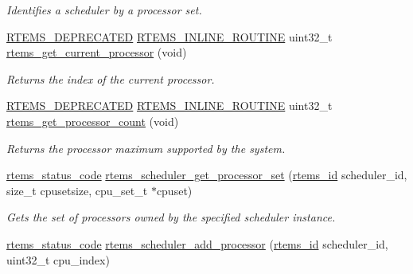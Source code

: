 \begin{DoxyCompactItemize}
\begin{DoxyCompactList}\small\item\em Identifies a scheduler by a processor set. \end{DoxyCompactList}\item 
\mbox{\hyperlink{group__RTEMSScoreBaseDefs_gab651a076d4d51d50221e7ef7ac99d4e7}{R\+T\+E\+M\+S\+\_\+\+D\+E\+P\+R\+E\+C\+A\+T\+ED}} \mbox{\hyperlink{group__RTEMSScoreBaseDefs_gac216239df231d5dbd15e3520b0b9313f}{R\+T\+E\+M\+S\+\_\+\+I\+N\+L\+I\+N\+E\+\_\+\+R\+O\+U\+T\+I\+NE}} uint32\+\_\+t \mbox{\hyperlink{group__ClassicTasks_ga2017f8bfa8565df99034f362638cb89c}{rtems\+\_\+get\+\_\+current\+\_\+processor}} (void)
\begin{DoxyCompactList}\small\item\em Returns the index of the current processor. \end{DoxyCompactList}\item 
\mbox{\hyperlink{group__RTEMSScoreBaseDefs_gab651a076d4d51d50221e7ef7ac99d4e7}{R\+T\+E\+M\+S\+\_\+\+D\+E\+P\+R\+E\+C\+A\+T\+ED}} \mbox{\hyperlink{group__RTEMSScoreBaseDefs_gac216239df231d5dbd15e3520b0b9313f}{R\+T\+E\+M\+S\+\_\+\+I\+N\+L\+I\+N\+E\+\_\+\+R\+O\+U\+T\+I\+NE}} uint32\+\_\+t \mbox{\hyperlink{group__ClassicTasks_ga055c5c7a9106ddce18326a347e77e1ee}{rtems\+\_\+get\+\_\+processor\+\_\+count}} (void)
\begin{DoxyCompactList}\small\item\em Returns the processor maximum supported by the system. \end{DoxyCompactList}\item 
\mbox{\hyperlink{group__ClassicStatus_ga545d41846817eaba6143d52ee4d9e9fe}{rtems\+\_\+status\+\_\+code}} \mbox{\hyperlink{group__ClassicTasks_ga6947e9b2f588f98314f573ae6207363e}{rtems\+\_\+scheduler\+\_\+get\+\_\+processor\+\_\+set}} (\mbox{\hyperlink{group__ClassicTasks_gab20892b814dced7dd4e5b9bf42becd57}{rtems\+\_\+id}} scheduler\+\_\+id, size\+\_\+t cpusetsize, cpu\+\_\+set\+\_\+t $\ast$cpuset)
\begin{DoxyCompactList}\small\item\em Gets the set of processors owned by the specified scheduler instance. \end{DoxyCompactList}\item 
\mbox{\hyperlink{group__ClassicStatus_ga545d41846817eaba6143d52ee4d9e9fe}{rtems\+\_\+status\+\_\+code}} \mbox{\hyperlink{group__ClassicTasks_ga3dcba5bc6f402c4fa35f0dc91dd1e3fd}{rtems\+\_\+scheduler\+\_\+add\+\_\+processor}} (\mbox{\hyperlink{group__ClassicTasks_gab20892b814dced7dd4e5b9bf42becd57}{rtems\+\_\+id}} scheduler\+\_\+id, uint32\+\_\+t cpu\+\_\+index)

\end{DoxyCompactItemize}
